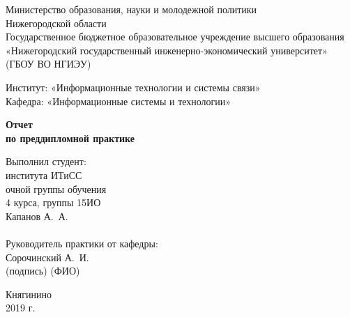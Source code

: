 \begin{titlepage}
\begin{center}
{ \normalsize \singlespacing Министерство образования, науки и молодежной политики \\
Нижегородской области \\
Государственное бюджетное образовательное учреждение высшего образования \\
«Нижегородский государственный инженерно-экономический университет»
(ГБОУ ВО НГИЭУ)
\\[1mm]
}
\begin{flushleft}
\hfill \break
\normalsize{Институт: «Информационные технологии и системы связи»}\\
\normalsize{Кафедра: «Информационные системы и технологии»}\\[23mm]
\end{flushleft}

\textbf{\Large Отчет \\ по преддипломной практике\\[22mm]
}
\end{center}

\hfill
\begin{minipage}{.5\textwidth}
\begin{flushright}

Выполнил студент:\\ 
института ИТиСС \\
очной группы обучения \\
4 курса, группы 15ИО \\
Капанов А.~А. \\
\underline{\hspace{1in}}\\[5mm]

Руководитель практики от кафедры:\\ 
\underline{\hspace{3cm}}
\hspace{3mm}
Сорочинский А.~И.\\[-1.5pt]
(подпись) \hspace{3.5cm}
(ФИО)
\end{flushright}
\end{minipage}%
\vfill
\begin{center}
 Княгинино \\ 2019 г.
\end{center}
\end{titlepage}